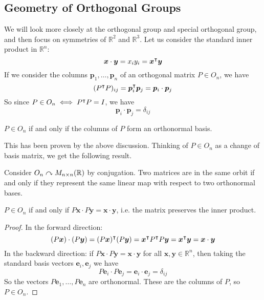 \documentclass{article}
\begin{document}
\subsection{Geometry of Orthogonal Groups}
We will look more closely at the orthogonal group and special orthogonal group, and then focus on symmetries of $\mathbb R^2$ and $\mathbb R^3$. Let us consider the standard inner product in $\mathbb R^n$:
\[ \bm x \cdot \bm y = x_iy_i = \bm x^\intercal \bm y \]
If we consider the columns $\bm p_1, \dots, \bm p_n$ of an orthogonal matrix $P \in O_n$, we have
\[ (P^\intercal P)_{ij} = \bm p_i^\intercal \bm p_j = \bm p_i \cdot \bm p_j \]
So since $P \in O_n \iff P^\intercal P = I$, we have
\[ \bm p_i \cdot \bm p_j = \delta_{ij} \]
\begin{proposition}
	$P \in O_n$ if and only if the columns of $P$ form an orthonormal basis.
\end{proposition}
This has been proven by the above discussion. Thinking of $P \in O_n$ as a change of basis matrix, we get the following result.
\begin{proposition}
	Consider $O_n \curvearrowright M_{n \times n}(\mathbb R)$ by conjugation. Two matrices are in the same orbit if and only if they represent the same linear map with respect to two orthonormal bases.
\end{proposition}
\begin{proposition}
	$P \in O_n$ if and only if $P \bm x \cdot P \bm y = \bm x \cdot \bm y$, i.e. the matrix preserves the inner product.
\end{proposition}
\begin{proof}
	In the forward direction:
	\[ (P\bm x) \cdot (P \bm y) = (P \bm x)^\intercal (P \bm y) = \bm x^\intercal P^\intercal P \bm y = \bm x^\intercal \bm y = \bm x \cdot \bm y \]
	In the backward direction: if $P\bm x \cdot P\bm y = \bm x \cdot \bm y$ for all $\bm x, \bm y \in \mathbb R^n$, then taking the standard basis vectors $\bm e_i, \bm e_j$ we have
	\[ P\bm e_i \cdot P\bm e_j = \bm e_i \cdot \bm e_j = \delta_{ij} \]
	So the vectors $P\bm e_1, \dots, P\bm e_n$ are orthonormal. These are the columns of $P$, so $P \in O_n$.
\end{proof}
\end{document}
